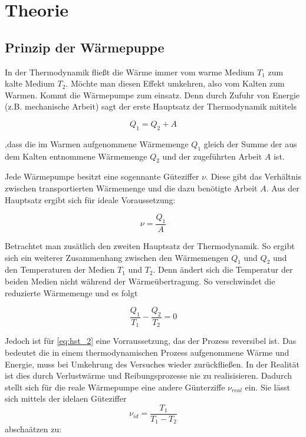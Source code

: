\section{Theorie}

\subsection{Prinzip der Wärmepuppe}

In der Thermodynamik fließt die Wärme immer 
vom warme Medium $T_1$ zum kalte Medium $T_2$.
Möchte man diesen Effekt umkehren, also vom Kalten 
zum Warmen. Kommt die Wärmepumpe zum einsatz.
Denn durch Zufuhr von Energie (z.B. mechanische Arbeit) sagt der erste 
Hauptsatz der Thermodynamik mititels

\begin{equation}
\label{eq:hst_1}
Q_1=Q_2+A
\end{equation}

,dass die im Warmen aufgenommene Wärmemenge $Q_1$ gleich 
der Summe der aus dem Kalten entnommene Wärmemenge $Q_2$
und der zugeführten Arbeit $A$ ist.

Jede Wärmepumpe besitzt eine sogennante Güteziffer $\nu$.
Diese gibt das Verhältnis zwischen transportierten Wärmemenge 
und die dazu benötigte Arbeit $A$.
Aus der Hauptsatz ergibt sich für ideale Voraussetzung:

\begin{equation}
\label{eq:best_kennziffer}
\nu=\frac{Q_1}{A}
\end{equation}

Betrachtet man zusätlich den zweiten Hauptsatz der Thermodynamik.
So ergibt sich ein weiterer Zusammenhang zwischen den Wärmemengen 
$Q_1$ und $Q_2$ und den Temperaturen der Medien $T_1$ und $T_2$.
Denn ändert sich die Temperatur der beiden Medien nicht während der 
Wärmeübertragung. 
So verschwindet die reduzierte Wärmemenge und es folgt

\begin{equation}
\label{eq:hst_2}
\frac{Q_1}{T_1}-\frac{Q_2}{T_2}=0
\end{equation}

Jedoch ist für \eqref{eq:hst_2} eine Vorraussetzung,
das der Prozess reversibel ist.
Das bedeutet die in einem thermodynamischen Prozess aufgenommene Wärme 
und Energie, muss bei Umkehrung des Versuches wieder zurückfließen.
In der Realität ist dies durch Verlustwärme und Reibungsprozesse
nie zu realisisieren.
Dadurch stellt sich für die reale Wärmepumpe eine andere 
Günterziffe $\nu_{real}$ ein. 
Sie lässt sich mittels der idelaen Güteziffer 
\begin{equation*}
\nu_{id}=\frac{T_1}{T_1-T_2}
\end{equation*}
abschaätzen zu:

